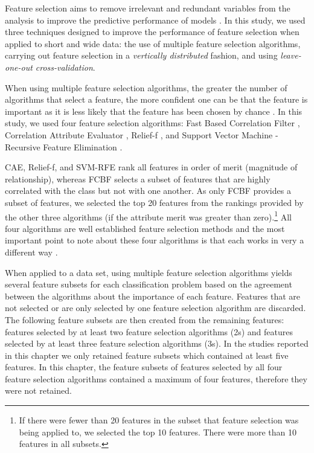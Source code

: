 \documentclass[
  12pt,
  a4paper,
]{book}
\begin{document}
Feature selection aims to remove irrelevant and redundant variables from the analysis to improve the predictive performance of models \citep{Guyon2003}. In this study, we used three techniques designed to improve the performance of feature selection when applied to short and wide data: the use of multiple feature selection algorithms, carrying out feature selection in a \emph{vertically distributed} fashion, and using \emph{leave-one-out cross-validation}.

When using multiple feature selection algorithms, the greater the number of algorithms that select a feature, the more confident one can be that the feature is important as it is less likely that the feature has been chosen by chance \citep{Visa2011}. In this study, we used four feature selection algorithms: Fast Based Correlation Filter \citep[FCBF;][]{Yu2003}, Correlation Attribute Evaluator \citep[CAE;][]{Bouckaert2018}, Relief-f \citep{Kira1992}, and Support Vector Machine - Recursive Feature Elimination \citep[SVM-RFE;][]{Guyon2002}.

CAE, Relief-f, and SVM-RFE rank all features in order of merit (magnitude of relationship), whereas FCBF selects a subset of features that are highly correlated with the class but not with one another. As only FCBF provides a subset of features, we selected the top 20 features from the rankings provided by the other three algorithms (if the attribute merit was greater than zero).\footnote{If there were fewer than 20 features in the subset that feature selection was being applied to, we selected the top 10 features. There were more than 10 features in all subsets.} All four algorithms are well established feature selection methods and the most important point to note about these four algorithms is that each works in very a different way \citep[see][]{Bolon-Canedo2015}.

When applied to a data set, using multiple feature selection algorithms yields several feature subsets for each classification problem based on the agreement between the algorithms about the importance of each feature. Features that are not selected or are only selected by one feature selection algorithm are discarded. The following feature subsets are then created from the remaining features: features selected by at least two feature selection algorithms (2s) and features selected by at least three feature selection algorithms (3s). In the studies reported in this chapter we only retained feature subsets which contained at least five features. In this chapter, the feature subsets of features selected by all four feature selection algorithms contained a maximum of four features, therefore they were not retained.
\end{document}
